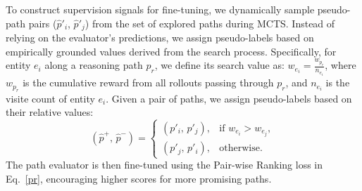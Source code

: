 To construct supervision signals for fine-tuning, we dynamically sample pseudo-path pairs ($\hat{p}'_i$, $\hat{p}'_j$) from the set of explored paths during MCTS. Instead of relying on the evaluator’s predictions, we assign pseudo-labels based on empirically grounded values derived from the search process. Specifically, for entity $e_i$ along a reasoning path $p_r$, we define its search value as:
$w_{e_i} = \frac{w_{p_r}}{n_{e_i}}$,
where $w_{p_r}$ is the cumulative reward from all rollouts passing through $p_r$, and $n_{e_i}$ is the visite count of entity $e_i$.
Given a pair of paths, we assign pseudo-labels based on their relative values:
\begin{equation}
    \left(\hat{p}^+,\, \hat{p}^-\right) =
\begin{cases}
(p'_i,\, p'_j), & \text{if } w_{e_i} > w_{e_j}, \\
(p'_j,\, p'_i), & \text{otherwise}.
\end{cases}
\end{equation}
The path evaluator is then fine-tuned using the Pair-wise Ranking loss in Eq.~\ref{pr}, encouraging higher scores for more promising paths.










